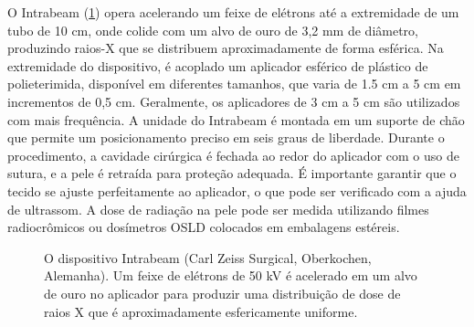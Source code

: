 \documentclass[11pt,a4paper]{article}
\begin{document}
	O Intrabeam (\ref{fig:iortIntrabeam}) opera acelerando um feixe de elétrons até a extremidade de um tubo de 10 cm, onde colide com um alvo de ouro de 3,2 mm de diâmetro, produzindo raios-X que se distribuem aproximadamente de forma esférica. Na extremidade do dispositivo, é acoplado um aplicador esférico de plástico de polieterimida, disponível em diferentes tamanhos, que varia de 1.5 cm a 5 cm em incrementos de 0,5 cm. Geralmente, os aplicadores de 3 cm a 5 cm são utilizados com mais frequência. A unidade do Intrabeam é montada em um suporte de chão que permite um posicionamento preciso em seis graus de liberdade. Durante o procedimento, a cavidade cirúrgica é fechada ao redor do aplicador com o uso de sutura, e a pele é retraída para proteção adequada. É importante garantir que o tecido se ajuste perfeitamente ao aplicador, o que pode ser verificado com a ajuda de ultrassom. A dose de radiação na pele pode ser medida utilizando filmes radiocrômicos ou dosímetros OSLD colocados em embalagens estéreis.

	\begin{figure}[h]
		\centering
		\caption{O dispositivo Intrabeam (Carl Zeiss Surgical, Oberkochen, Alemanha). Um feixe de elétrons de 50 kV é acelerado em um alvo de ouro no aplicador para produzir uma distribuição de dose de raios X que é aproximadamente esfericamente uniforme.}
		\label{fig:iortIntrabeam}
	\end{figure}
\end{document}
